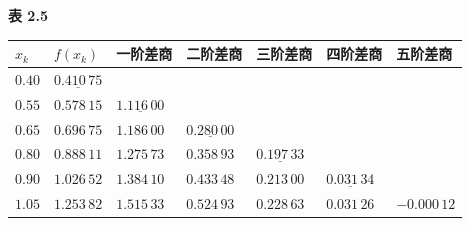 \documentclass[
  10pt,
  fontset=fandol]{ctexart}
\newcounter{none} %
\begin{document}
\textbf{表 2.5}

{\def\LTcaptype{none} %
\begin{longtable}[]{@{}
  >{\raggedright\arraybackslash}p{}
  >{\raggedright\arraybackslash}p{}
  >{\raggedright\arraybackslash}p{}
  >{\raggedright\arraybackslash}p{}
  >{\raggedright\arraybackslash}p{}
  >{\raggedright\arraybackslash}p{}
  >{\raggedright\arraybackslash}p{}@{}}
\toprule\noalign{}
\begin{minipage}[b]{\linewidth}\raggedright
\(x_k\)
\end{minipage} & \begin{minipage}[b]{\linewidth}\raggedright
\(f(x_k)\)
\end{minipage} & \begin{minipage}[b]{\linewidth}\raggedright
一阶差商
\end{minipage} & \begin{minipage}[b]{\linewidth}\raggedright
二阶差商
\end{minipage} & \begin{minipage}[b]{\linewidth}\raggedright
三阶差商
\end{minipage} & \begin{minipage}[b]{\linewidth}\raggedright
四阶差商
\end{minipage} & \begin{minipage}[b]{\linewidth}\raggedright
五阶差商
\end{minipage} \\
\midrule\noalign{}
\endhead
\bottomrule\noalign{}
\endlastfoot
\(0.40\) & \(\underline{0.410\,75}\) & & & & & \\
\(0.55\) & \(0.578\,15\) & \(\underline{1.116\,00}\) & & & & \\
\(0.65\) & \(0.696\,75\) & \(1.186\,00\) & \(\underline{0.280\,00}\) & & & \\
\(0.80\) & \(0.888\,11\) & \(1.275\,73\) & \(0.358\,93\) & \(\underline{0.197\,33}\) & & \\
\(0.90\) & \(1.026\,52\) & \(1.384\,10\) & \(0.433\,48\) & \(0.213\,00\) & \(\underline{0.031\,34}\) & \\
\(1.05\) & \(1.253\,82\) & \(1.515\,33\) & \(0.524\,93\) & \(0.228\,63\) & \(0.031\,26\) & \(-0.000\,12\) \\
\end{longtable}
}
\end{document}
